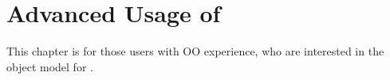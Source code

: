 
\chapter{Advanced Usage of \hypre}

This chapter is for those users with OO experience, who are interested
in the object model for \hypre{}.
